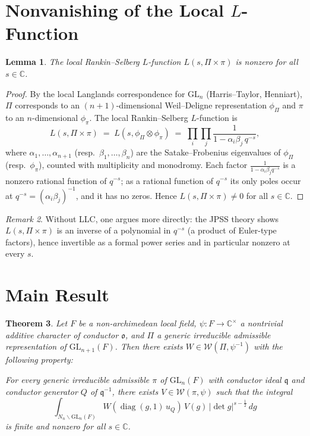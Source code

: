 \documentclass[12pt]{article}
\newtheorem{theorem}{Theorem}
\newtheorem{lemma}[theorem]{Lemma}
\theoremstyle{definition}
\theoremstyle{remark}
\newtheorem{remark}[theorem]{Remark}
\DeclareMathOperator{\diag}{diag}
\begin{document}
\section{Nonvanishing of the Local $L$-Function}

\begin{lemma}\label{lem:nonvanish}
The local Rankin--Selberg $L$-function $L(s,\Pi\times\pi)$ is nonzero for all
$s\in\mathbb{C}$.
\end{lemma}

\begin{proof}
By the local Langlands correspondence for $\mathrm{GL}_n$ (Harris--Taylor, Henniart),
$\Pi$ corresponds to an $(n+1)$-dimensional Weil--Deligne representation
$\phi_\Pi$ and $\pi$ to an $n$-dimensional $\phi_\pi$.  The local Rankin--Selberg
$L$-function is
\[
  L(s,\Pi\times\pi)
  \;=\;
  L(s,\phi_\Pi\otimes\phi_\pi)
  \;=\;
  \prod_i\prod_j\frac{1}{1-\alpha_i\beta_j\,q^{-s}},
\]
where $\alpha_1,\ldots,\alpha_{n+1}$ (resp.\ $\beta_1,\ldots,\beta_n$) are the
Satake--Frobenius eigenvalues of $\phi_\Pi$ (resp.\ $\phi_\pi$), counted with
multiplicity and monodromy.  Each factor $\frac{1}{1-\alpha_i\beta_j q^{-s}}$
is a nonzero rational function of $q^{-s}$; as a rational function of $q^{-s}$
its only poles occur at $q^{-s}=(\alpha_i\beta_j)^{-1}$, and it has no zeros.
Hence $L(s,\Pi\times\pi)\ne0$ for all $s\in\mathbb{C}$.
\end{proof}

\begin{remark}
Without LLC, one argues more directly: the JPSS theory shows
$L(s,\Pi\times\pi)$ is an inverse of a polynomial in $q^{-s}$
(a product of Euler-type factors), hence invertible as a formal power series
and in particular nonzero at every $s$.
\end{remark}

\section{Main Result}

\begin{theorem}\label{thm:main}
Let $F$ be a non-archimedean local field, $\psi:F\to\mathbb{C}^\times$ a
nontrivial additive character of conductor $\mathfrak{o}$, and $\Pi$ a generic
irreducible admissible representation of $\mathrm{GL}_{n+1}(F)$.  Then there
exists $W\in\mathcal{W}(\Pi,\psi^{-1})$ with the following property:

For every generic irreducible admissible $\pi$ of $\mathrm{GL}_n(F)$ with
conductor ideal $\mathfrak{q}$ and conductor generator $Q$ of $\mathfrak{q}^{-1}$,
there exists $V\in\mathcal{W}(\pi,\psi)$ such that the integral
\[
  \int_{N_n\backslash\mathrm{GL}_n(F)}
    W\!\left(\diag(g,1)\,u_Q\right)\,V(g)\,|\det g|^{s-\frac12}\,dg
\]
is finite and nonzero for all $s\in\mathbb{C}$.
\end{theorem}
\end{document}
